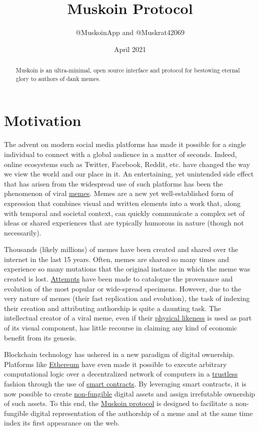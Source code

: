 \documentclass{article}
\title{Muskoin Protocol}
\author{@MuskoinApp and @Muskrat42069}
\date{April 2021}
\begin{document}
\maketitle

\begin{abstract}

Muskoin is an ultra-minimal, open source interface and protocol for bestowing eternal glory to authors of dank memes.

\end{abstract}

\section{Motivation}
The advent on modern social media platforms has made it possible for a single individual to connect with a global audience in a matter of seconds. Indeed, online ecosystems 
such as Twitter, Facebook, Reddit, etc. have changed the way we view the world and our place in it. An entertaining, yet unintended side effect that has arisen from 
the widespread use of such platforms has been the phenomenon of viral \href{https://en.wikipedia.org/wiki/Meme}{memes}. Memes are a new yet well-established form of expression 
that combines visual and written elements into a work that, along with temporal and societal context, can quickly communicate a complex set of ideas or shared experiences that 
are typically humorous in nature (though not necessarily). 

Thousands (likely millions) of memes have been created and shared over the internet in the last 15 years. Often, memes are shared so many times and experience so many mutations
that the original instance in which the meme was created is lost. \href{https://knowyourmeme.com/ }{Attempts} have been made to catalogue the provenance and evolution of the most popular or wide-spread specimens. However, due to the very nature of memes (their fast replication and evolution), the task of indexing their creation and attributing authorship is quite a daunting task. The intellectual creator of a viral meme, even if their \href{https://en.wikipedia.org/wiki/Bad_Luck_Brian}{physical likeness} is used as
part of its visual component, has little recourse in claiming any kind of economic benefit from its genesis. 

Blockchain technology has ushered in a new paradigm of digital ownership. Platforms like \href{https://ethereum.org/en/}{Ethereum} have even made it possible 
to execute arbitrary computational logic over a decentralized network of computers in a 
\href{https://www.nananke.com/single-post/2018/08/07/zero-trust-vs-trustless-systems}{trustless} fashion through the use of 
\href{https://en.wikipedia.org/wiki/Smart_contract}{smart contracts}. By leveraging smart contracts, it is now possible to create 
\href{https://www.investopedia.com/terms/f/fungibility.asp}{non-fungible} digital assets and assign irrefutable ownership of such assets. To this end, the 
\href{https://muskoin.app}{Muskoin protocol} is designed to facilitate a non-fungible digital representation of the authorship of a meme and at the same 
time index its first appearance on the web.
\end{document}
